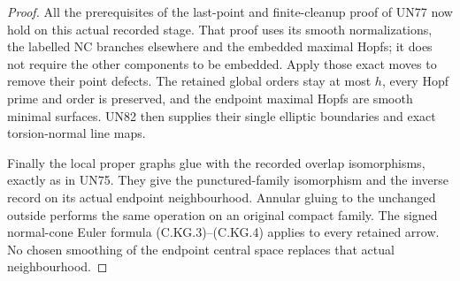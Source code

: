 \begin{proof}
All the prerequisites of the last-point and
finite-cleanup proof of UN77 now hold on this
actual recorded stage. That proof uses its
smooth normalizations, the labelled NC branches
elsewhere and the embedded maximal Hopfs; it
does not require the other components to be
embedded. Apply those exact moves to remove
their point defects. The retained global orders
stay at most \(h\), every Hopf prime and order
is preserved, and the endpoint maximal Hopfs
are smooth minimal surfaces. UN82 then supplies
their single elliptic boundaries and exact
torsion-normal line maps.

Finally the local proper graphs glue with the
recorded overlap isomorphisms, exactly as in
UN75. They give the punctured-family isomorphism
and the inverse record on its actual endpoint
neighbourhood. Annular gluing to the unchanged
outside performs the same operation on an
original compact family. The signed normal-cone
Euler formula (C.KG.3)--(C.KG.4) applies to
every retained arrow. No chosen smoothing of
the endpoint central space replaces that
actual neighbourhood.
\end{proof}
